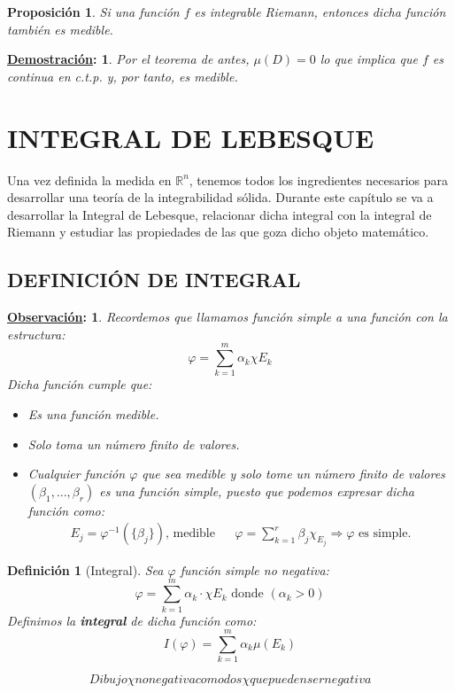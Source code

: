 \documentclass[10pt,a4paper,openright]{book}
\theoremstyle{break}
\newtheorem*{defi}{Definición}
\newtheorem*{prop}{Proposición}
\newtheorem*{demo}{\underline{Demostración}:}
\newtheorem*{obs}{\underline{Observación}:}
\begin{document}
\begin{prop}
Si una función $f$ es integrable Riemann, entonces dicha función también es medible.
\end{prop}
\begin{demo}
Por el teorema de antes, $\mu(D) = 0$ lo que implica que $f$ es continua en c.t.p. y, por tanto, es medible.
\end{demo}

\chapter*{INTEGRAL DE LEBESQUE}
Una vez definida la medida en $\mathbb{R}^n$, tenemos todos los ingredientes necesarios para desarrollar una teoría de la integrabilidad sólida. Durante este capítulo se va a desarrollar la Integral de Lebesque, relacionar dicha integral con la integral de Riemann y estudiar las propiedades de las que goza dicho objeto matemático.

\section*{DEFINICIÓN DE INTEGRAL}

\begin{obs}
Recordemos que llamamos función simple a una función con la estructura:
$$\varphi = \sum_{k=1}^{m} \alpha_k\chi{E_k}$$
Dicha función cumple que:
\begin{itemize}
    \item Es una función medible.
    \item Solo toma un número finito de valores.
    \item Cualquier función $\varphi$ que sea medible y solo tome un número finito de valores $(\beta_1, \ldots, \beta_r)$ es una función simple, puesto que podemos expresar dicha función como:
\begin{align*}
E_j = \varphi^{-1}\left(\{\beta_j\}\right) \text{, medible} & & \varphi = \sum_{k=1}^{r} \beta_j \chi_{E_j} \Rightarrow \varphi \text{ es simple.}
\end{align*}
\end{itemize}
\end{obs}

\begin{defi}[Integral]
Sea $\varphi$ función simple no negativa:
$$\varphi = \sum_{k=1}^{m} \alpha_k \cdot \chi{E_k} \mbox{ donde } \left(\alpha_k > 0\right)$$
Definimos la \textbf{integral} de dicha función como:
$$I\left(\varphi\right) = \sum_{k=1}^{m} \alpha_k \mu\left(E_k\right)$$
\end{defi}
$$Dibujo \chi no negativa como dos \chi que pueden ser negativa$$ 
\end{document}
